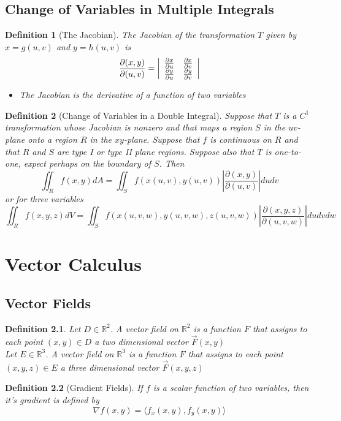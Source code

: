 \documentclass[10pt]{report}
\newtheorem{def2}{Definition}[section]
\newcommand{\grad}{\nabla}
\begin{document}
\section{Change of Variables in Multiple Integrals}
\begin{def2}[The Jacobian]
The Jacobian of the transformation $T$ given by $x=g(u,v)$ and $y=h(u,v)$ is
$$\frac{\partial (x,y)}{\partial (u,v)} = \left| \begin{array}{c c}
\frac{\partial x}{\partial u} & \frac{\partial x}{\partial v}\\
\frac{\partial y}{\partial u} & \frac{\partial y}{\partial v}
\end{array}\right|$$
\begin{itemize}
\item[Note:] The Jacobian is the derivative of a function of two variables
\end{itemize}
\end{def2}
\begin{def2}[Change of Variables in a Double Integral]
Suppose that $T$ is a $C^1$ transformation whose Jacobian is nonzero and that maps a region $S$ in the $uv$-plane onto a region $R$ in the $xy$-plane. Suppose that $f$ is continuous on $R$ and that $R$ and $S$ are type I or type II plane regions. Suppose also that $T$ is one-to-one, expect perhaps on the boundary of $S$. Then
$$\iint_R f(x,y)dA = \iint_S f(x(u,v),y(u,v))\left|\frac{\partial(x,y)}{\partial(u,v)}\right| dudv$$
or for three variables
$$\iint_R f(x,y, z)dV = \iint_S f(x(u,v,w),y(u,v,w), z(u,v,w))\left|\frac{\partial(x,y,z)}{\partial(u,v,w)}\right| dudvdw$$
\end{def2}

\chapter{Vector Calculus}
\section{Vector Fields}
\begin{def2}
Let $D\in\mathbb{R}^2$. A vector field on $\mathbb{R}^2$ is a function $F$ that assigns to each point $(x,y)\in D$ a two dimensional vector $\vec{F}(x,y)$\\
Let $E\in\mathbb{R}^3$. A vector field on $\mathbb{R}^3$ is a function $F$ that assigns to each point $(x,y,z)\in E$ a three dimensional vector $\vec{F}(x,y,z)$
\end{def2}
\begin{def2}[Gradient Fields]
If $f$ is a scalar function of two variables, then it's gradient is defined by
$$\grad f(x,y) = \langle f_x(x,y), f_y(x,y)\rangle$$
\end{def2}
\end{document}
